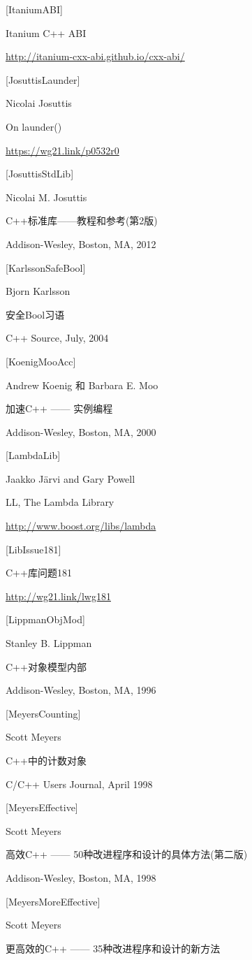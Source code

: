 {[ItaniumABI]}

Itanium C++ ABI

\url{http://itanium-cxx-abi.github.io/cxx-abi/}

{[JosuttisLaunder]}

Nicolai Josuttis

On launder()

\url{https://wg21.link/p0532r0}

{[JosuttisStdLib]}

Nicolai M. Josuttis

C++标准库——教程和参考(第2版)

Addison-Wesley, Boston, MA, 2012

{[KarlssonSafeBool]}

Bjorn Karlsson

安全Bool习语

C++ Source, July, 2004

{[KoenigMooAcc]}

Andrew Koenig 和 Barbara E. Moo

加速C++ —— 实例编程

Addison-Wesley, Boston, MA, 2000

{[LambdaLib]}

Jaakko J{\"a}rvi and Gary Powell

LL, The Lambda Library

\url{http://www.boost.org/libs/lambda}

{[LibIssue181]}

C++库问题181

\url{http://wg21.link/lwg181}

{[LippmanObjMod]}

Stanley B. Lippman

C++对象模型内部

Addison-Wesley, Boston, MA, 1996

{[MeyersCounting]}

Scott Meyers

C++中的计数对象

C/C++ Users Journal, April 1998

{[MeyersEffective]}

Scott Meyers

高效C++ —— 50种改进程序和设计的具体方法(第二版)

Addison-Wesley, Boston, MA, 1998

{[MeyersMoreEffective]}

Scott Meyers

更高效的C++ —— 35种改进程序和设计的新方法

